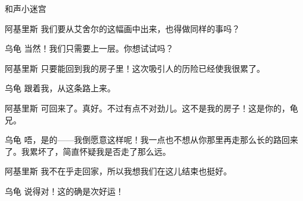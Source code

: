 \begin{dialog}{和声小迷宫}
\begin{dialogue}
\begin{dialogue}
\begin{dialogue}
    \item[阿基里斯]我们要从艾舍尔的这幅画中出来，也得做同样的事吗？

    \item[乌龟]当然！我们只需要上一层。你想试试吗？

    \item[阿基里斯]只要能回到我的房子里！这次吸引人的历险已经使我很累了。

    \item[乌龟]跟着我，从这条路上来。

  \end{dialogue}

  \item[阿基里斯]可回来了。真好。不过有点不对劲儿。这不是我的房子！这是你的，龟兄。

  \item[乌龟]唔，是的——我倒愿意这样呢！我一点也不想从你那里再走那么长的路回来了。我累坏了，简直怀疑我是否走了那么远。

  \item[阿基里斯]我不在乎走回家，所以我想我们在这儿结束也挺好。

  \item[乌龟]说得对！这的确是次好运！

\end{dialogue}
\end{dialogue}

\end{dialog}
